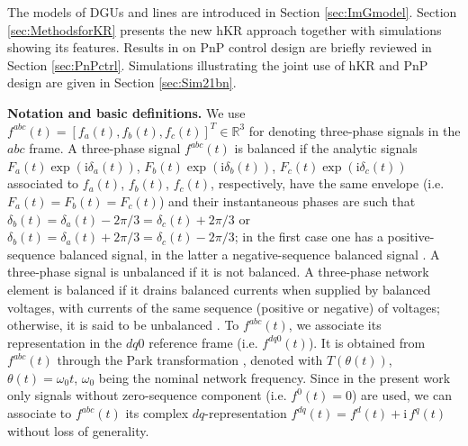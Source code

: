 \documentclass[a4paper]{article}
\theoremstyle{plain}
\def\Rset{\mathbb{R}}
\begin{document}
The models of DGUs and lines are introduced in Section \ref{sec:ImGmodel}. Section \ref{sec:MethodsforKR} presents the new hKR approach together with simulations showing its features. Results in \cite{riverso2015plug} on PnP control design are briefly reviewed in Section \ref{sec:PnPctrl}. Simulations illustrating the joint use of hKR and PnP design are given in Section \ref{sec:Sim21bn}.


\textbf{Notation and basic definitions.} We use $f^{abc}(t)=[f_a(t),f_b(t),f_c(t)]^{T}\in \Rset^{3}$ for denoting three-phase signals in the $abc$ frame. 
A three-phase signal $f^{abc}(t)$ is balanced if the analytic signals \cite{bracewell1965fourier} $F_a(t)\exp{\left(\mathrm i \delta_a(t)\right)}$, $F_b(t)\exp{\left(\mathrm i \delta_b(t)\right)}$, $F_c(t)\exp{\left(\mathrm i \delta_c(t)\right)}$ associated  to $f_a(t)$, $f_b(t)$, $f_c(t)$, respectively, have the same envelope (i.e. $F_a(t)=F_b(t)=F_c(t)$) and their instantaneous phases are such that $\delta_b(t)=\delta_a(t)-2\pi/3=\delta_c(t)+2\pi/3$ or $\delta_b(t)=\delta_a(t)+2\pi/3=\delta_c(t)-2\pi/3$; in the first case one has a positive-sequence balanced signal, in the latter a negative-sequence balanced signal \cite{cablea2014method}. A three-phase signal is unbalanced if it is not balanced. A three-phase network element is balanced if it drains balanced currents when supplied by balanced voltages, with currents of the same sequence (positive or negative) of voltages; otherwise, it is said to be unbalanced \cite{schiffer15_mod}.
To $f^{abc}(t)$, we associate its representation in the  $dq0$ reference frame (i.e. $f^{dq0}(t)$). It is obtained from $f^{abc}(t)$ through the Park transformation \cite{park1929two}, denoted with $T(\theta(t))$, $\theta(t) = \omega_{0}t$, $\omega_0$ being the nominal network frequency. Since in the present work only signals without zero-sequence component (i.e. $f^0(t)=0$) are used, we can associate to $f^{abc}(t)$ its complex $dq$-representation $f^{dq}(t)=f^d(t)+\mathrm i \, f^q(t)$ without loss of generality.
\end{document}
